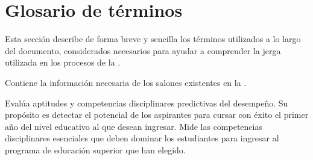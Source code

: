 \chapter{Glosario de términos}
\label{chapter:GlosarioDeTerminos}
    
Esta sección describe de forma breve y sencilla los términos utilizados a lo largo del documento, considerados necesarios para ayudar a comprender la jerga utilizada en los procesos de la .

	
\begin{description}
	 Contiene la información necesaria de los salones existentes en la .

	\label{glosario:EXANI II Admision} Evalúa aptitudes y competencias disciplinares predictivas del desempeño. Su propósito es detectar el potencial de los aspirantes para cursar con éxito el primer año del nivel educativo al que desean ingresar.
	\label{glosario:EXANI II Diagnostico} Mide las competencias disciplinares esenciales que deben dominar los estudiantes para ingresar al programa de educación superior que han elegido.
	
	
\end{description}
